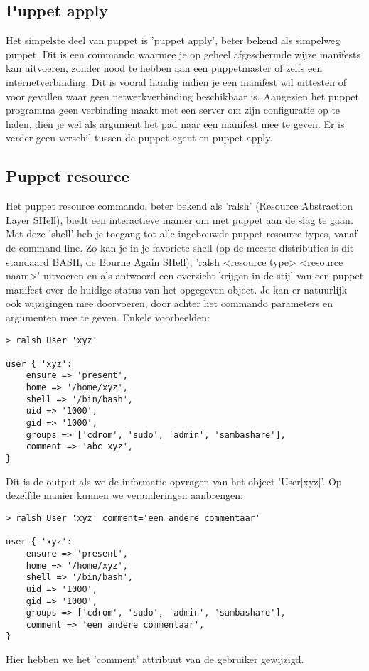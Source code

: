 \subsection{Puppet apply}
Het simpelste deel van puppet is 'puppet apply', beter bekend als simpelweg puppet. Dit is een commando waarmee je op geheel afgeschermde wijze manifests kan uitvoeren, zonder nood te hebben aan een puppetmaster of zelfs een internetverbinding. Dit is vooral handig indien je een manifest wil uittesten of voor gevallen waar geen netwerkverbinding beschikbaar is. Aangezien het puppet programma geen verbinding maakt met een server om zijn configuratie op te halen, dien je wel als argument het pad naar een manifest mee te geven. Er is verder geen verschil tussen de puppet agent en puppet apply.

\subsection{Puppet resource}
Het puppet resource commando, beter bekend als 'ralsh' (Resource Abstraction Layer SHell), biedt een interactieve manier om met puppet aan de slag te gaan. Met deze 'shell' heb je toegang tot alle ingebouwde puppet resource types, vanaf de command line. Zo kan je in je favoriete shell (op de meeste distributies is dit standaard BASH, de Bourne Again SHell), 'ralsh <resource type> <resource naam>' uitvoeren en als antwoord een overzicht krijgen in de stijl van een puppet manifest over de huidige status van het opgegeven object. Je kan er natuurlijk ook wijzigingen mee doorvoeren, door achter het commando parameters en argumenten mee te geven. Enkele voorbeelden:
\begin{code}
\begin{lstlisting}
> ralsh User 'xyz'

user { 'xyz':
	ensure => 'present',
	home => '/home/xyz',
	shell => '/bin/bash',
	uid => '1000',
	gid => '1000',
	groups => ['cdrom', 'sudo', 'admin', 'sambashare'],
	comment => 'abc xyz',
}
\end{lstlisting}
\end{code}
Dit is de output als we de informatie opvragen van het object 'User[xyz]'. Op dezelfde manier kunnen we veranderingen aanbrengen:
\begin{code}
\begin{lstlisting}
> ralsh User 'xyz' comment='een andere commentaar'

user { 'xyz':
	ensure => 'present',
	home => '/home/xyz',
	shell => '/bin/bash',
	uid => '1000',
	gid => '1000',
	groups => ['cdrom', 'sudo', 'admin', 'sambashare'],
	comment => 'een andere commentaar',
}
\end{lstlisting}
\end{code}
Hier hebben we het 'comment' attribuut van de gebruiker gewijzigd.

